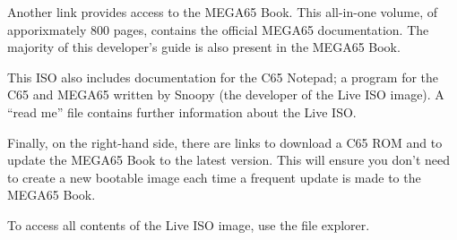 Another link provides access to the MEGA65 Book. This all-in-one volume, of apporixmately 800 pages, contains the official MEGA65 documentation. The majority of this developer's guide is also present in the MEGA65 Book.

This ISO also includes documentation for the C65 Notepad; a program for the C65 and MEGA65 written by Snoopy (the developer of the Live ISO image). A ``read me'' file contains further information about the Live ISO.

Finally, on the right-hand side, there are links to download a C65 ROM and to update the MEGA65 Book to the latest version. This will ensure you don't need to create a new bootable image each time a frequent update is made to the MEGA65 Book.

To access all contents of the Live ISO image, use the file explorer.

